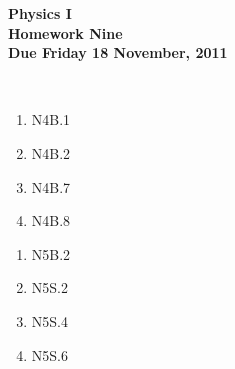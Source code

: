 \documentclass[12pt]{article}
\begin{document}
\pagestyle{empty}
 
\begin{center}
{\large {\bf Physics I}}\\
\medskip
{\large {\bf Homework Nine}}\\
\medskip
{ {\bf Due Friday 18  November, 2011}}\\
\end{center}

\hspace{2mm}\\


\begin{enumerate}
\setlength{\itemsep}{-1mm}
  \item N4B.1
  \item N4B.2
  \item N4B.7
  \item N4B.8
\end{enumerate}


\begin{enumerate}
\setlength{\itemsep}{-1mm}
  \item N5B.2
  \item N5S.2
  \item N5S.4
  \item N5S.6
\end{enumerate}
\end{document}
